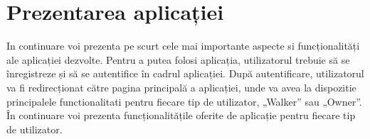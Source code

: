 \chapter{Prezentarea aplicației}

In continuare voi prezenta pe scurt cele mai importante aspecte si funcționalități ale aplicației dezvolte. Pentru a putea folosi aplicația, utilizatorul trebuie să se înregistreze și să se autentifice în cadrul aplicației. După autentificare, utilizatorul va fi redirecționat către pagina principală a aplicației, unde va avea la dispozitie principalele functionalitati pentru fiecare tip de utilizator, „Walker” sau „Owner”. În continuare voi prezenta funcționalitățile oferite de aplicație pentru fiecare tip de utilizator.

\begin{figure}[!htb]

\end{figure}
